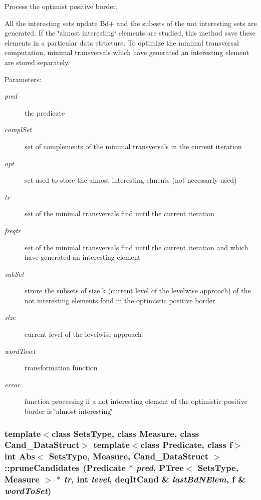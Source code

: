 Process the optimist positive border. 

All the interesting sets update Bd+ and the subests of the not interesting sets are generated. If the \char`\"{}almost interesting\char`\"{} elements are studied, this method save these elements in a particular data structure. To optimize the minimal transversal computation, minimal transversals which have generated an interesting element are stored separately.

\begin{Desc}
\item[Parameters:]
\begin{description}
\item[{\em pred}]the predicate \item[{\em compl\-Set}]set of complements of the minimal transversals in the current iteration \item[{\em opt}]set used to store the almost interesting elments (not necessarly used) \item[{\em tr}]set of the minimal transversals find until the current iteration \item[{\em freqtr}]set of the minimal transversals find until the current iteration and which have generated an interesting element \item[{\em sub\-Set}]strore the subsets of size k (current level of the levelwise approach) of the not interesting elements fond in the optimistic positive border \item[{\em size}]current level of the levelwise approach \item[{\em word\-Toset}]transformation function \item[{\em error}]function processing if a not interesting element of the optimistic positive border is \char`\"{}almost interesting\char`\"{} \end{description}
\end{Desc}
\subsubsection{\setlength{\rightskip}{0pt plus 5cm}template$<$class Sets\-Type, class Measure, class Cand\_\-Data\-Struct$>$ template$<$class Predicate, class f$>$ int {\bf Abs}$<$ Sets\-Type, Measure, Cand\_\-Data\-Struct $>$::prune\-Candidates ({\bf Predicate} $\ast$ {\em pred}, {\bf PTree}$<$ Sets\-Type, Measure $>$ $\ast$ {\em tr}, int {\em level}, deq\-It\-Cand \& {\em last\-Bd\-NElem}, f \& {\em word\-To\-Set})\hspace{0.3cm}{\tt  [protected]}}\label{class_abs_46ecf54530c316a639b3533386af9d4b}


